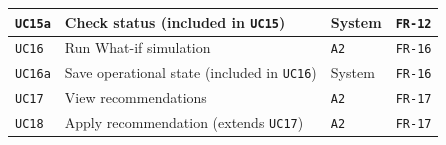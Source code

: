 \begin{table}[H]
\begin{tabularx}{\textwidth}{|C{1.5cm}|Y|C{2.1cm}|L{2.8cm}|}
    \hline
    \texttt{UC15a} & Check status (included in \texttt{UC15}) & System & \texttt{FR-12} \\
    \hline
    \texttt{UC16} & Run What-if simulation & \texttt{A2} & \texttt{FR-16} \\
    \hline
    \texttt{UC16a} & Save operational state (included in \texttt{UC16}) & System & \texttt{FR-16} \\
    \hline
    \texttt{UC17} & View recommendations & \texttt{A2} & \texttt{FR-17} \\
    \hline
    \texttt{UC18} & Apply recommendation (extends \texttt{UC17}) & \texttt{A2} & \texttt{FR-17} \\
    \hline
  \end{tabularx}
\end{table}

